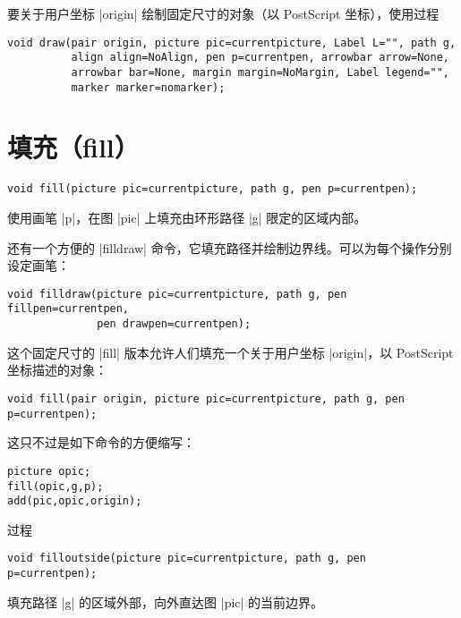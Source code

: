 \documentclass[nofonts,CJKnormalspaces]{ctexbook}[2009/05/20]
\newcommand*\prgname[1]{\textsf{#1}}
\begin{document}
要关于用户坐标 |origin| 绘制固定尺寸的对象（以 \prgname{PostScript}
坐标），使用过程
\begin{lstlisting}
void draw(pair origin, picture pic=currentpicture, Label L="", path g,
          align align=NoAlign, pen p=currentpen, arrowbar arrow=None,
          arrowbar bar=None, margin margin=NoMargin, Label legend="",
          marker marker=nomarker);
\end{lstlisting}



\section{填充（fill）}
\label{sec:fill}

\begin{lstlisting}
void fill(picture pic=currentpicture, path g, pen p=currentpen);
\end{lstlisting}
使用画笔 |p|，在图 |pic| 上填充由环形路径 |g| 限定的区域内部。

还有一个方便的 |filldraw| 命令，它填充路径并绘制边界线。可以为每个操作分别
设定画笔：
\begin{lstlisting}
void filldraw(picture pic=currentpicture, path g, pen fillpen=currentpen,
              pen drawpen=currentpen);
\end{lstlisting}

这个固定尺寸的 |fill| 版本允许人们填充一个关于用户坐标 |origin|，以
\prgname{PostScript} 坐标描述的对象：
\begin{lstlisting}
void fill(pair origin, picture pic=currentpicture, path g, pen p=currentpen);
\end{lstlisting}
这只不过是如下命令的方便缩写：
\begin{lstlisting}
picture opic;
fill(opic,g,p);
add(pic,opic,origin);
\end{lstlisting}

过程
\begin{lstlisting}
void filloutside(picture pic=currentpicture, path g, pen p=currentpen);
\end{lstlisting}
填充路径 |g| 的区域外部，向外直达图 |pic| 的当前边界。
\end{document}
